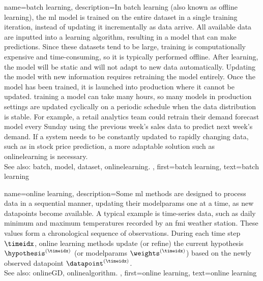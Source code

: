 {name={batch learning},
	description={In \gls{batch} learning (also known as offline learning), the \gls{ml} \gls{model} 
		is trained on the entire \gls{dataset} in a single \gls{training} iteration, instead of updating it incrementally as \gls{data} arrive. 
		All available \gls{data} are inputted into a learning \gls{algorithm}, resulting in a \gls{model} that can make \glspl{prediction}. 
		Since these \glspl{dataset} tend to be large, \gls{training} is computationally expensive and time-consuming, 
		so it is typically performed offline. After learning, the \gls{model} will be static and will not adapt to new \gls{data} automatically. 
		Updating the \gls{model} with new information requires retraining the \gls{model} entirely. Once the \gls{model} has been trained, 
		it is launched into production where it cannot be updated. \Gls{training} a \gls{model} can take many hours, so many \glspl{model} in production 
		settings are updated cyclically on a periodic schedule when the \gls{data} distribution is stable. For example, a retail analytics team 
		could retrain their demand forecast \gls{model} every Sunday using the previous week's sales \gls{data} to predict next week's demand. 
		If a system needs to be constantly updated to rapidly changing \gls{data}, such as in stock price \gls{prediction}, a more adaptable solution 
		such as \gls{onlinelearning} is necessary.
		\\
		See also: \gls{batch}, \gls{model}, \gls{dataset}, \gls{onlinelearning}. },
	first={batch learning}, 
	text={batch learning}
}

{name={online learning},
	description={Some \gls{ml} methods are designed to 
	    	process \gls{data} in a sequential manner, updating their \glspl{modelparam} 
		one at a time, as new \glspl{datapoint} become available. A typical example 
		is time-series \gls{data}, such as daily \gls{minimum} and \gls{maximum} 
		temperatures recorded by an \gls{fmi} weather station. These values form 
		a chronological sequence of observations. During each time step $\timeidx$, 
		online learning methods update (or refine) the current \gls{hypothesis} 
		$\hypothesis^{(\timeidx)}$ (or \glspl{modelparam} $\weights^{(\timeidx)}$) 
		based on the newly observed \gls{datapoint} $\datapoint^{(\timeidx)}$. 
		\\ 
		See also: \gls{onlineGD}, \gls{onlinealgorithm}. },
	first={online learning},
	text={online learning} 
}

